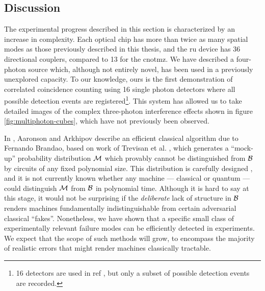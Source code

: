 \subsection{Discussion}
The experimental progress described in this section is characterized by an increase in complexity. Each optical chip has more than twice as many spatial modes as those previously described in this thesis, and the \gls{ru} device has 36 directional couplers, compared to 13 for the \acrshort{cnotmz}. We have described a four-photon source which, although not entirely novel, has been used in a previously unexplored capacity. To our knowledge, ours is the first demonstration of correlated coincidence counting using 16 single photon detectors where all possible detection events are registered\footnote{16 detectors are used in ref  \cite{Yao2012}, but only a subset of possible detection events are recorded.}. This system has allowed us to take detailed images of the complex three-photon interference effects shown in figure \ref{fig:multiphoton-cubes}, which have not previously been observed.

In \cite{Aaronson2013}, Aaronson and Arkhipov describe an efficient classical algorithm due to Fernando Brandao, based on work of Trevisan et al. \cite{Trevisan2009}, which generates a ``mock-up'' probability distribution $\mathcal{M}$ which provably cannot be distinguished from $\mathcal{B}$ by circuits of any fixed polynomial size. This distribution is carefully designed , and it is not currently known whether any machine --- classical or quantum --- could distinguish $\mathcal{M}$ from $\mathcal{B}$ in polynomial time. Although it is hard to say at this stage, it would not be surprising if the \emph{deliberate} lack of structure in $\mathcal{B}$ renders \bosonsampling machines fundamentally indistinguishable from certain adversarial classical ``fakes''.  Nonetheless, we have shown that a specific small class of experimentally relevant \bosonsampling failure modes can be efficiently detected in experiments. We expect that the scope of such methods will grow, to encompass the majority of realistic errors that might render \bosonsampling machines classically tractable.

